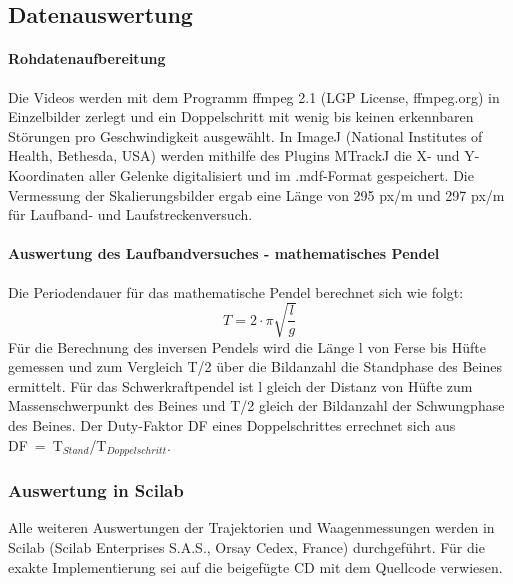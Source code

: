 \subsection{Datenauswertung}
\paragraph{Rohdatenaufbereitung}
Die Videos werden mit dem Programm ffmpeg 2.1 (LGP License, ffmpeg.org) in Einzelbilder zerlegt und ein Doppelschritt mit wenig bis keinen erkennbaren Störungen pro Geschwindigkeit ausgewählt. In ImageJ (National Institutes of Health, Bethesda, USA) werden mithilfe des Plugins MTrackJ \autocite{meijering2012methods} die X- und Y-Koordinaten aller Gelenke digitalisiert und im .mdf-Format gespeichert. Die Vermessung der Skalierungsbilder ergab eine Länge von 295 px/m und 297 px/m für Laufband- und Laufstreckenversuch.
\paragraph{Auswertung des Laufbandversuches - mathematisches Pendel}
Die Periodendauer für das mathematische Pendel berechnet sich wie folgt:
\begin{equation}
T = 2 \cdot \pi \sqrt{\frac{l}{g}}
\end{equation}
Für die Berechnung des inversen Pendels wird die Länge l von Ferse bis Hüfte gemessen und zum Vergleich T/2 über die Bildanzahl die Standphase des Beines ermittelt. Für das Schwerkraftpendel ist l gleich der Distanz von Hüfte zum Massenschwerpunkt des Beines und T/2 gleich der Bildanzahl der Schwungphase des Beines. Der Duty-Faktor DF eines Doppelschrittes errechnet sich aus DF~=~T$_{Stand}$/T$_{Doppelschritt}$.
\subsubsection*{Auswertung in Scilab}
Alle weiteren Auswertungen der Trajektorien und Waagenmessungen werden in Scilab (Scilab Enterprises S.A.S., Orsay Cedex, France) durchgeführt. Für die exakte Implementierung sei auf die beigefügte CD mit dem Quellcode verwiesen.

